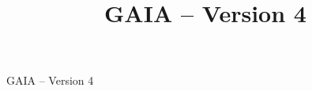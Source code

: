 \documentclass[11pt,twoside]{article}  %
\begin{document}

%
%


%

\title{GAIA -- Version 4}

%
%
%
%
%

         {GAIA -- Version 4}
\end{document}
